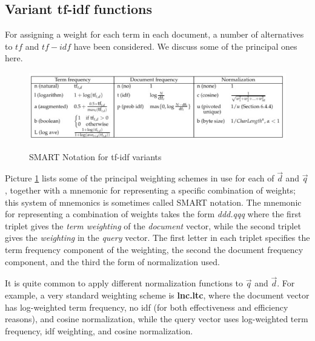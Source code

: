 \subsection{Variant tf-idf functions}
For assigning a weight for each term in each document, a number of alternatives to $tf$ and $tf-idf$ have been considered. We discuss some of the principal ones here.

\begin{figure}[h!]
		\centering
		\includegraphics[scale = 2.0]{img/SMART.jpg}
		\label{SMART}
        \caption{SMART Notation for tf-idf variants}
\end{figure}

Picture \ref{SMART} lists some of the principal weighting schemes in use for each of $\Vec{d}$ and $\Vec{q}$, together with a mnemonic for representing a specific combination of weights; this system of mnemonics is sometimes called SMART notation. The mnemonic for representing a combination of weights takes the form \textit{ddd.qqq} where the first triplet gives the \textit{term weighting} of the \textit{document} vector, while the second triplet gives the \textit{weighting} in the \textit{query} vector.  The first letter in each triplet specifies the term frequency component of the weighting, the second the document frequency component, and the third the form of normalization used. 

It is quite common to apply different normalization functions to $\Vec{q}$ and $\Vec{d}$. For example, a very standard weighting scheme is \textbf{lnc.ltc}, where the document vector has log-weighted term frequency, no idf (for both effectiveness and efficiency reasons), and cosine normalization, while the query vector uses log-weighted term frequency, idf weighting, and cosine normalization.
